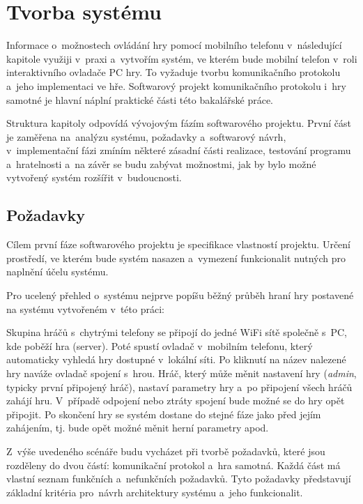 \documentclass[thesis=B,czech,hidelinks]{FITthesis}[2012/06/26] %
\begin{document}
\chapter{Tvorba systému}
\label{chapter:implementation}

Informace o~možnostech ovládání hry pomocí mobilního telefonu v~následující kapitole využiji v~praxi a~vytvořím systém, ve kterém bude mobilní telefon v~roli interaktivního ovladače PC hry. To vyžaduje tvorbu komunikačního protokolu a~jeho implementaci ve hře. Softwarový projekt komunikačního protokolu i~hry samotné je hlavní náplní praktické části této bakalářské práce.

Struktura kapitoly odpovídá vývojovým fázím softwarového projektu. \cite{si} První část je zaměřena na~analýzu systému, požadavky a~softwarový návrh, v~implementační fázi zmíním některé zásadní části realizace, testování programu a~hratelnosti a~na závěr se budu zabývat možnostmi, jak by bylo možné vytvořený systém rozšířit v~budoucnosti.

\section{Požadavky}
\label{section:requirements}

Cílem první fáze softwarového projektu je specifikace vlastností projektu. Určení prostředí, ve kterém bude systém nasazen a~vymezení funkcionalit nutných pro naplnění účelu systému.

Pro ucelený přehled o~systému nejprve popíšu běžný průběh hraní hry postavené na systému vytvořeném v~této práci:

Skupina hráčů s~chytrými telefony se připojí do jedné WiFi sítě společně s~PC, kde poběží hra (server). Poté spustí ovladač v~mobilním telefonu, který automaticky vyhledá hry dostupné v~lokální síti. Po kliknutí na název nalezené hry naváže ovladač spojení s~hrou. Hráč, který může měnit nastavení hry (\textit{admin}, typicky první připojený hráč), nastaví parametry hry a~po připojení všech hráčů zahájí hru. V~případě odpojení nebo ztráty spojení bude možné se do hry opět připojit. Po skončení hry se systém dostane do stejné fáze jako před jejím zahájením, tj. bude opět možné měnit herní parametry apod.

Z~výše uvedeného scénáře budu vycházet při tvorbě požadavků, které jsou rozděleny do dvou částí: komunikační protokol a~hra samotná. Každá část má vlastní seznam funkčních a~nefunkčních požadavků. Tyto požadavky představují základní kritéria pro~návrh architektury systému a~jeho funkcionalit.
\end{document}
